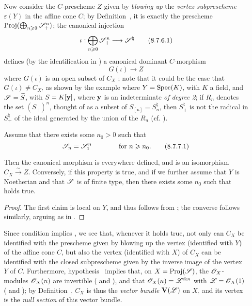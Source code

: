 \begin{env}[8.7.6]
\label{II.8.7.6}
Now consider the $C$-prescheme $Z$ given by \emph{blowing up} the \emph{vertex subprescheme $\varepsilon(Y)$} in the affine cone $C$;
by Definition~, it is exactly the prescheme $\operatorname{Proj}(\bigoplus_{n\geqslant0}\mathscr{S}_+^n)$;
the canonical injection
\[
\label{II.8.7.6.1}
  \iota: \bigoplus_{n\geq0} \sh{S}_+^n \to \sh{S}^\natural
\tag{8.7.6.1}
\]
defines (by the identification in ) a canonical dominant $C$-morphism
\[
\label{II.8.7.6.2}
  G(\iota) \to Z
\tag{8.7.6.2}
\]
where $G(\iota)$ is an open subset of $C_X$ ;
note that it could be the case that $G(\iota)\neq C_X$, as shown by the example where $Y=\operatorname{Spec}(K)$, with $K$ a field, and $\mathscr{S}=\widetilde{S}$, with $S=K[\mathbf{y}]$, where $\mathbf{y}$ is an indeterminate \emph{of degree 2};
if $R_n$ denotes the set $(S_+)^n$, thought of as a subset of $S_{[n]}=S_n^\natural$, then $S_+^\natural$ is not the radical in $S_+^\natural$ of the ideal generated by the union of the $R_n$ (cf. ).
\end{env}

\begin{corollary}[8.7.7]
\label{II.8.7.7}
Assume that there exists some $n_0>0$ such that
\[
\label{II.8.7.7.1}
  \mathscr{S}_n = \mathscr{S}_1^n
  \qquad\qquad
  \mbox{for $n\geqslant n_0$.}
\tag{8.7.7.1}
\]

Then the canonical morphism  is everywhere defined, and is an isomorphism $C_X\xrightarrow{\sim}Z$.
Conversely, if this property is true, and if we further assume that $Y$ is Noetherian and that $\mathscr{S}$ is of finite type, then there exists some $n_0$ such that  holds true.
\end{corollary}

\begin{proof}
\label{II.8.7.7}
The first claim is local on $Y$, and thus follows from ;
the converse follows similarly, arguing as in .
\end{proof}

\begin{remark}[8.7.8]
\label{II.8.7.8}
Since condition  implies , we see that, whenever it holds true, not only can $C_X$ be identified with the prescheme given by blowing up the vertex (identified with $Y$) of the affine cone $C$, but also the vertex (identified with $X$) of $C_X$ can be identified with the closed subprescheme given by the inverse image of the vertex $Y$ of $C$.
Furthermore, hypothesis~ implies that, on $X=\operatorname{Proj}(\mathscr{S})$, the $\mathscr{O}_X$-modules $\mathscr{O}_X(n)$ are invertible ( and ), and that $\mathscr{O}_X(n)=\mathscr{L}^{\otimes n}$ with $\mathscr{L}=\mathscr{O}_X(1)$ ( and );
by Definition~, $C_X$ is thus the \emph{vector bundle} $\mathbf{V}(\mathscr{L})$ on $X$, and its vertex is the \emph{null section} of this vector bundle.
\end{remark}



